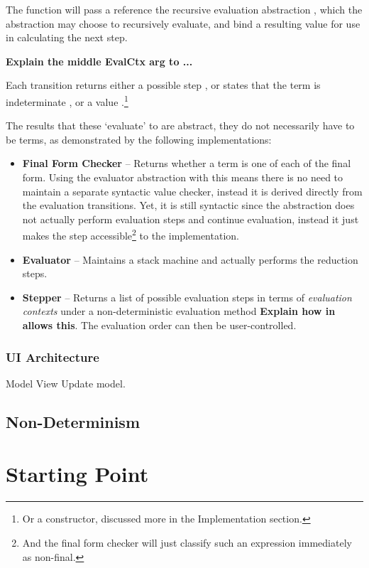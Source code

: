 The  function will pass a reference the recursive evaluation abstraction , which the abstraction may choose to recursively evaluate, and bind a resulting value for use in calculating the next step.

\textbf{Explain the middle EvalCtx arg to ...}

Each transition returns either a possible step , or states that the term is indeterminate , or a value .\footnote{Or a constructor, discussed more in the Implementation section.}

The results that these `evaluate' to are abstract, they do not necessarily have to be terms, as demonstrated by the following implementations:
\begin{itemize}
\item \textbf{Final Form Checker} -- Returns whether a term is one of each of the final form. Using the evaluator abstraction with this means there is no need to maintain a separate syntactic value checker, instead it is derived directly from the evaluation transitions. Yet, it is still syntactic since the abstraction does not actually perform evaluation steps and continue evaluation, instead it just makes the step accessible\footnote{And the final form checker will just classify such an expression immediately as non-final.} to the implementation.
\item \textbf{Evaluator} -- Maintains a stack machine and actually performs the reduction steps.
\item \textbf{Stepper} -- Returns a list of possible evaluation steps in terms of \textit{evaluation contexts} under a non-deterministic evaluation method \textbf{Explain how  in  allows this}. The evaluation order can then be user-controlled. 
\end{itemize}


\subsubsection{UI Architecture}
Model View Update model.

\subsection{Non-Determinism}


\section{Starting Point}
